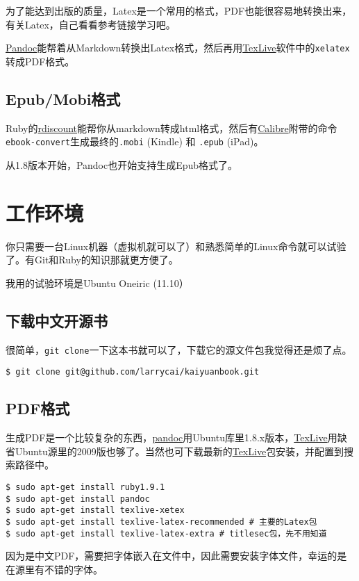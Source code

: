 \documentclass[a4paper]{book}
\begin{document}
为了能达到出版的质量，Latex是一个常用的格式，PDF也能很容易地转换出来，有关Latex，自己看看参考链接学习吧。

\href{http://johnmacfarlane.net/pandoc/}{Pandoc}能帮着从Markdown转换出Latex格式，然后再用\href{http://www.tug.org/texlive/}{TexLive}软件中的{\texttt{xelatex}}转成PDF格式。

\subsection{Epub/Mobi格式}

Ruby的\href{https://github.com/rtomayko/rdiscount}{rdiscount}能帮你从markdown转成html格式，然后有\href{calibre}{Calibre}附带的命令{\texttt{ebook-convert}}生成最终的{\texttt{.mobi}} (Kindle) 和 {\texttt{.epub}} (iPad)。

从1.8版本开始，Pandoc也开始支持生成Epub格式了。

\section{工作环境}

你只需要一台Linux机器（虚拟机就可以了）和熟悉简单的Linux命令就可以试验了。有Git和Ruby的知识那就更方便了。

我用的试验环境是Ubuntu Oneiric (11.10）

\subsection{下载中文开源书}

很简单，{\texttt{git clone}}一下这本书就可以了，下载它的源文件包我觉得还是烦了点。

{\footnotesize\begin{shaded}\begin{verbatim}
$ git clone git@github.com/larrycai/kaiyuanbook.git
\end{verbatim}\end{shaded}}
\subsection{PDF格式}

生成PDF是一个比较复杂的东西，\href{http://johnmacfarlane.net/pandoc/}{pandoc}用Ubuntu库里1.8.x版本，\href{http://www.tug.org/texlive/}{TexLive}用缺省Ubuntu源里的2009版也够了。当然也可下载最新的\href{http://www.tug.org/texlive/}{TexLive}包安装，并配置到搜索路径中。

{\footnotesize\begin{shaded}\begin{verbatim}
$ sudo apt-get install ruby1.9.1
$ sudo apt-get install pandoc
$ sudo apt-get install texlive-xetex
$ sudo apt-get install texlive-latex-recommended # 主要的Latex包
$ sudo apt-get install texlive-latex-extra # titlesec包，先不用知道
\end{verbatim}\end{shaded}}
因为是中文PDF，需要把字体嵌入在文件中，因此需要安装字体文件，幸运的是在源里有不错的字体。
\end{document}

